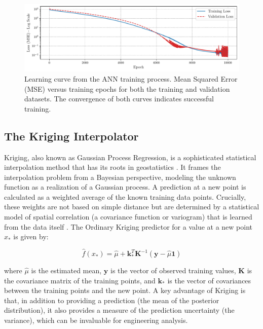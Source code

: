 \documentclass[tg, EN]{ufabcFHZh_tg}
\begin{document}
\begin{figure}[H]
    \centering
    \includegraphics[width=\textwidth]{Figuras/nn_loss.pdf}
    \caption{Learning curve from the ANN training process. Mean Squared Error (MSE) versus training epochs for both the training and validation datasets. The convergence of both curves indicates successful training.}
    \label{fig:ann_loss}
\end{figure}

\subsection{The Kriging Interpolator}

Kriging, also known as Gaussian Process Regression, is a sophisticated statistical interpolation method that has its roots in geostatistics \citep{rasmussen2006, sacks1989}. It frames the interpolation problem from a Bayesian perspective, modeling the unknown function as a realization of a Gaussian process. A prediction at a new point is calculated as a weighted average of the known training data points. Crucially, these weights are not based on simple distance but are determined by a statistical model of spatial correlation (a covariance function or variogram) that is learned from the data itself \citep{jones1998, ng2018}. The Ordinary Kriging predictor for a value at a new point $x_*$ is given by:

\begin{equation}
\hat{f}(x_*) = \hat{\mu} + \mathbf{k}_*^T \mathbf{K}^{-1} (\mathbf{y} - \hat{\mu}\mathbf{1})
\end{equation}

where $\hat{\mu}$ is the estimated mean, $\mathbf{y}$ is the vector of observed training values, $\mathbf{K}$ is the covariance matrix of the training points, and $\mathbf{k}_*$ is the vector of covariances between the training points and the new point. A key advantage of Kriging is that, in addition to providing a prediction (the mean of the posterior distribution), it also provides a measure of the prediction uncertainty (the variance), which can be invaluable for engineering analysis.
\end{document}
